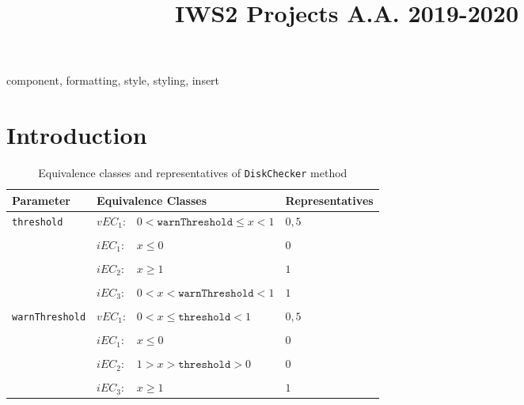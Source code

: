 \documentclass[conference]{IEEEtran}
\begin{document}
\title{IWS2 Projects A.A. 2019-2020}

\author{
}

\maketitle

\begin{IEEEkeywords}
component, formatting, style, styling, insert
\end{IEEEkeywords}




\section{Introduction}

\begin{table*}
  \caption{Equivalence classes and representatives of \texttt{DiskChecker} method}
  \label{tab:libraries}
  \begin{tabular}{llp{10cm}p{5cm}}
    \toprule
    \textbf{Parameter} & \multicolumn{2}{|l|}{\textbf{Equivalence Classes}} & \textbf{Representatives} \\
    \midrule
    
	\multirow{3}{*}{\texttt{threshold}} & $vEC_1$: & $0 < \texttt{warnThreshold} \leq x < 1$  & $0,5$ \\    
    
    \\[-1em] 
    & $iEC_1$: & $x \leq 0$ & $0$ \\ 
    
    \\[-1em]
    & $iEC_2$: & $x \geq 1$ & $1$ \\
    
    \\[-1em]
    & $iEC_3$: & $0 < x < \texttt{warnThreshold} < 1$ & $1$ \\
    
    \\[-1em] \hline 
	   
    \multirow{3}{*}{\texttt{warnThreshold}} & $vEC_1$: & $0 < x \leq \texttt{threshold} < 1 $  & $0,5$ \\    
    
    \\[-1em] 
    & $iEC_1$: & $x \leq 0$ & $0$ \\ 
    
	\\[-1em] 
    & $iEC_2$: & $1 > x > \texttt{threshold} > 0$ & $0$ \\  
    
    \\[-1em] 
    & $iEC_3$: & $x \geq 1$ & $1$ \\    
    
    \bottomrule
  \end{tabular}
\end{table*}
\end{document}
